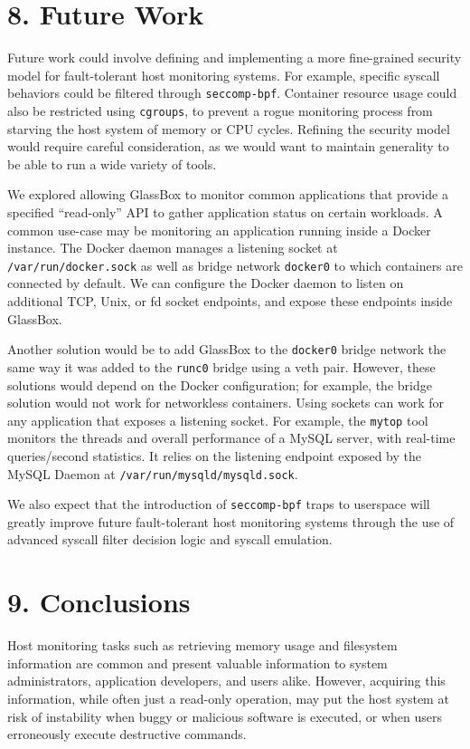\documentclass{proc}
\begin{document}
\section*{8. Future Work}
Future work could involve defining and implementing a more fine-grained security model for fault-tolerant host monitoring systems. For example, specific syscall behaviors could be filtered through \texttt{seccomp-bpf}. Container resource usage could also be restricted using \texttt{cgroups}, to prevent a rogue monitoring process from starving the host system of memory or CPU cycles. Refining the security model would require careful consideration, as we would want to maintain generality to be able to run a wide variety of tools.

We explored allowing GlassBox to monitor common applications that provide a specified ``read-only'' API to gather application status on certain workloads. A common use-case may be monitoring an application running inside a Docker instance. The Docker daemon manages a listening socket at \texttt{/var/run/docker.sock} as well as bridge network \texttt{docker0} to which containers are connected by default. We can configure the Docker daemon to listen on additional TCP, Unix, or fd socket endpoints, and expose these endpoints inside GlassBox.

Another solution would be to add GlassBox to the \texttt{docker0} bridge network the same way it was added to the \texttt{runc0} bridge using a veth pair. However, these solutions would depend on the Docker configuration; for example, the bridge solution would not work for networkless containers. Using sockets can work for any application that exposes a listening socket. For example, the \texttt{mytop} tool monitors the threads and overall performance of a MySQL server, with real-time queries/second statistics. It relies on the listening endpoint exposed by the MySQL Daemon at \texttt{/var/run/mysqld/mysqld.sock}.

We also expect that the introduction of \texttt{seccomp-bpf} traps to userspace \cite{seccompuserspace} will greatly improve future fault-tolerant host monitoring systems through the use of advanced syscall filter decision logic and syscall emulation.

\section*{9. Conclusions}

Host monitoring tasks such as retrieving memory usage and filesystem information are common and present valuable information to system administrators, application developers, and users alike. However, acquiring this information, while often just a read-only operation, may put the host system at risk of instability when buggy or malicious software is executed, or when users erroneously execute destructive commands.
\end{document}
